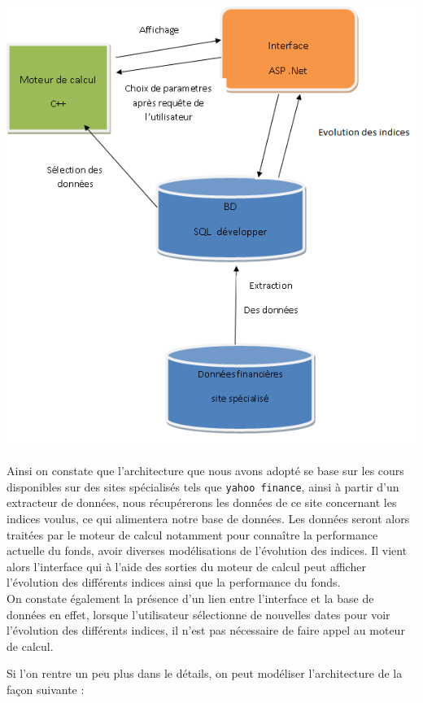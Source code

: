\documentclass[french,12pt,a4paper]{article}
\begin{document}
\begin{center}
\includegraphics[scale=0.5]{graphe.png}
\end{center}

\noindent Ainsi on constate que l'architecture que nous avons adopté se base sur les cours disponibles sur des sites spécialisés tels que \lstinline!yahoo finance!, ainsi à partir d'un extracteur de données, nous récupérerons les données de ce site concernant les indices voulus, ce qui alimentera notre base de données. Les données seront alors traitées par le moteur de calcul notamment pour connaître la performance actuelle du fonds, avoir diverses modélisations de l'évolution des indices. Il vient alors l'interface qui à l'aide des sorties du moteur de calcul peut afficher l'évolution des différents indices ainsi que la performance du fonds.\\
On constate également la présence d'un lien entre l'interface et la base de données en effet, lorsque l'utilisateur sélectionne de nouvelles dates pour voir l'évolution des différents indices, il n'est pas nécessaire de faire appel au moteur de calcul.

Si l'on rentre un peu plus dans le détails, on peut modéliser l'architecture de la façon suivante :
\end{document}
